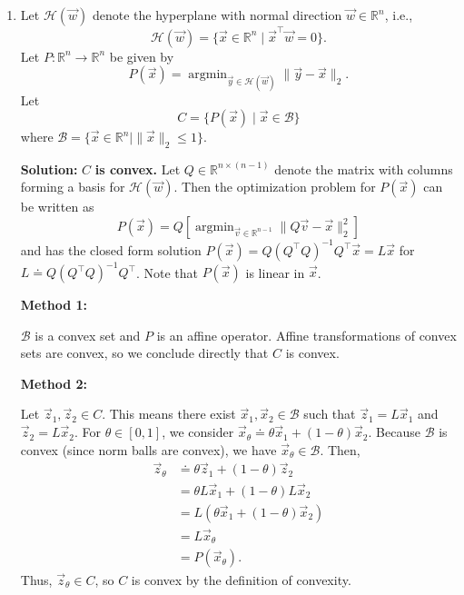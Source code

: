 \documentclass[10pt]{article}
\theoremstyle{definition}
\theoremstyle{plain}
\newcommand{\RR}{\mathbb{R}}
\DeclareMathOperator*{\argmin}{argmin}
\begin{document}
\begin{enumerate}[label=(\alph*)]
    \item Let $\mathcal{H}(\vec{w})$ denote the hyperplane with normal direction $\vec{w} \in \RR^n$, i.e.,
    \begin{equation}
        \mathcal{H}(\vec{w}) = \{\vec{x} \in \RR^n \mid \vec{x}^\top \vec{w} = 0\}.
    \end{equation}
    Let $P : \RR^n \to \RR^n$ be given by
    \begin{equation}
        P(\vec{x}) = \argmin_{\vec{y} \in \mathcal{H}(\vec{w})} \|\vec{y} - \vec{x}\|_2.
    \end{equation}
    Let
    \begin{equation}
        C = \{P(\vec{x}) \mid \vec{x} \in \mathcal{B}\}
    \end{equation}
    where $\mathcal{B} = \{\vec{x} \in \RR^n \mid \|\vec{x}\|_2 \le 1\}$.

    \textbf{Solution:} $C$ \textbf{is convex.} Let $Q \in \RR^{n \times (n-1)}$ denote the matrix with columns forming a basis for $\mathcal{H}(\vec{w})$. Then the optimization problem for $P(\vec{x})$ can be written as
    \begin{equation}
        P(\vec{x}) = Q \left[\argmin_{\vec{v} \in \RR^{n-1}} \|Q\vec{v} - \vec{x}\|_2^2\right]
    \end{equation}
    and has the closed form solution $P(\vec{x}) = Q(Q^\top Q)^{-1}Q^\top \vec{x} = L\vec{x}$ for $L \doteq Q(Q^\top Q)^{-1}Q^\top$. Note that $P(\vec{x})$ is linear in $\vec{x}$.

    \textbf{Method 1:}

    $\mathcal{B}$ is a convex set and $P$ is an affine operator. Affine transformations of convex sets are convex, so we conclude directly that $C$ is convex.

    \textbf{Method 2:}

    Let $\vec{z}_1, \vec{z}_2 \in C$. This means there exist $\vec{x}_1, \vec{x}_2 \in \mathcal{B}$ such that $\vec{z}_1 = L\vec{x}_1$ and $\vec{z}_2 = L\vec{x}_2$. For $\theta \in [0,1]$, we consider $\vec{x}_\theta \doteq \theta \vec{x}_1 + (1-\theta)\vec{x}_2$. Because $\mathcal{B}$ is convex (since norm balls are convex), we have $\vec{x}_\theta \in \mathcal{B}$. Then,
    \begin{align}
        \vec{z}_\theta &\doteq \theta \vec{z}_1 + (1-\theta)\vec{z}_2 \\
        &= \theta L \vec{x}_1 + (1-\theta) L \vec{x}_2 \\
        &= L(\theta \vec{x}_1 + (1-\theta)\vec{x}_2) \\
        &= L \vec{x}_\theta \\
        &= P(\vec{x}_\theta).
    \end{align}
    Thus, $\vec{z}_\theta \in C$, so $C$ is convex by the definition of convexity.
\end{enumerate}
\end{document}

